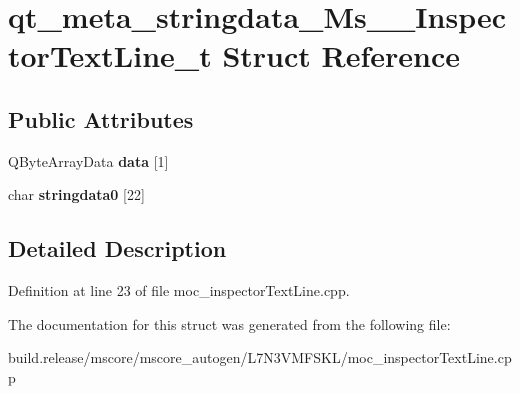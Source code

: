 \hypertarget{structqt__meta__stringdata___ms_____inspector_text_line__t}{}\section{qt\+\_\+meta\+\_\+stringdata\+\_\+\+Ms\+\_\+\+\_\+\+Inspector\+Text\+Line\+\_\+t Struct Reference}
\label{structqt__meta__stringdata___ms_____inspector_text_line__t}
\subsection*{Public Attributes}
\begin{DoxyCompactItemize}
\item 
\mbox{\label{structqt__meta__stringdata___ms_____inspector_text_line__t_acb7df9e865b2b1e9b781a6ac66396347}} 
Q\+Byte\+Array\+Data {\bfseries data} \mbox{[}1\mbox{]}
\item 
\mbox{\label{structqt__meta__stringdata___ms_____inspector_text_line__t_a8f98fe0c466357d39854723b3c359a01}} 
char {\bfseries stringdata0} \mbox{[}22\mbox{]}
\end{DoxyCompactItemize}


\subsection{Detailed Description}


Definition at line 23 of file moc\+\_\+inspector\+Text\+Line.\+cpp.



The documentation for this struct was generated from the following file\+:\begin{DoxyCompactItemize}
\item 
build.\+release/mscore/mscore\+\_\+autogen/\+L7\+N3\+V\+M\+F\+S\+K\+L/moc\+\_\+inspector\+Text\+Line.\+cpp\end{DoxyCompactItemize}
